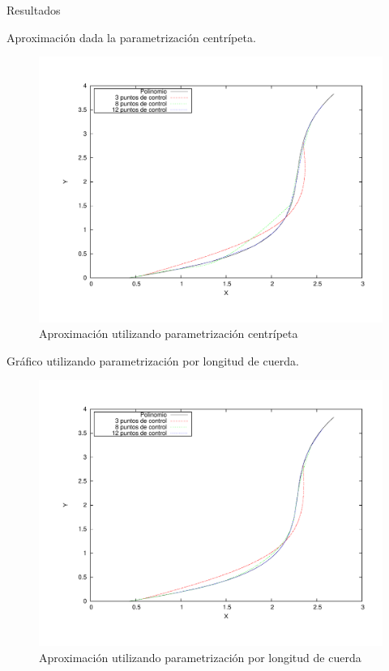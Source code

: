 \begin{section}{Resultados}
	\VSP
	
	Aproximación dada la parametrización centrípeta.
	
	\begin{figure}[H]
	  \centering
		\includegraphics[width=14cm]{graficos/centripetal_grafiquinSame.pdf}
	  \caption{Aproximación utilizando parametrización centrípeta}
	  \label{fig:centripetal}
	\end{figure}
	
	\VSP

	Gráfico utilizando parametrización por longitud de cuerda.

	\begin{figure}[H]
	  \centering
		\includegraphics[width=14cm]{graficos/chordLength_grafiquinSame.pdf}
	  \caption{Aproximación utilizando parametrización por longitud de cuerda}
	  \label{fig:chordLength}
	\end{figure}
	
	\VSP
	

	
\end{section}
